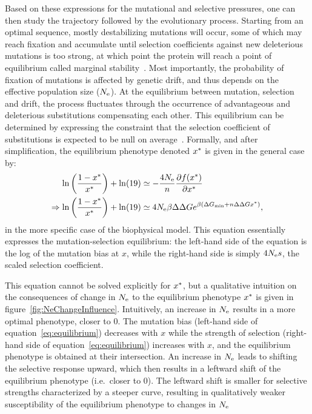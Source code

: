 \documentclass{article}
\begin{document}
Based on these expressions for the mutational and selective pressures, one can then study the trajectory followed by the evolutionary process.
Starting from an optimal sequence, mostly destabilizing mutations will occur, some of which may reach fixation and accumulate until selection coefficients against new deleterious mutations is too strong, at which point the protein will reach a point of equilibrium called marginal stability~\citep{Taverna2002, Bloom2007}.
Most importantly, the probability of fixation of mutations is affected by {genetic drift}, and thus depends on the {effective population size} ($N_{\text{e}}$).
At the equilibrium between mutation, selection and drift, the process fluctuates through the occurrence of advantageous and deleterious {substitutions} compensating each other.
This equilibrium can be determined by expressing the constraint that the selection coefficient of {substitutions} is expected to be null on average~\citep{Goldstein2013}.
Formally, and after simplification, the equilibrium {phenotype} denoted $x^{*}$ is given in the general case by:
\begin{align}
    \ln \left( \frac{1 - x^{*}}{x^{*}} \right) + \ln (19) & \simeq - \frac{4N_{\text{e}}}{n} \frac{ \partial f (x^{*}) }{\partial {x^{*}}} \\
    \Rightarrow \ln \left( \frac{1 - x^{*}}{x^{*}} \right) + \ln (19) & \simeq 4N_{\text{e}} \beta \Delta \Delta G e^{\beta (\Delta G_{\text{min}} + n \Delta \Delta G x^{*})} \text{,} \label{eq:equilibrium}
\end{align}
in the more specific case of the biophysical model.
This equation essentially expresses the mutation-selection equilibrium: the left-hand side of the equation is the log of the mutation bias at $x$, while the right-hand side is simply $4 N_{\text{e}} s$, the scaled selection coefficient.

This equation cannot be solved explicitly for $x^{*}$, but a qualitative intuition on the consequences of change in $N_{\text{e}}$ to the equilibrium {phenotype} $x^{*}$ is given in figure~\ref{fig:NeChangeInfluence}.
Intuitively, an increase in $N_{\text{e}}$ results in a more optimal {phenotype}, closer to $0$.
The mutation bias (left-hand side of equation~\ref{eq:equilibrium}) decreases with $x$ while the strength of selection (right-hand side of equation~\ref{eq:equilibrium}) increases with $x$, and the equilibrium {phenotype} is obtained at their intersection.
An increase in $N_{\text{e}}$ leads to shifting the selective response upward, which then results in a leftward shift of the equilibrium {phenotype} (i.e.~closer to $0$).
The leftward shift is smaller for selective strengths characterized by a steeper curve, resulting in qualitatively weaker susceptibility of the equilibrium {phenotype} to changes in $N_{\text{e}}$
\end{document}
